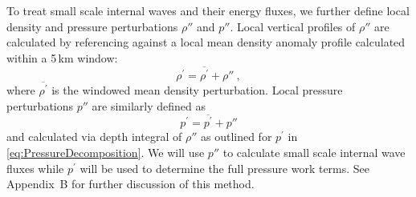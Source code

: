 \documentclass{ametsocV6.1}
\begin{document}
To treat small scale internal waves and their energy fluxes, we further define local density and pressure perturbations $\rho''$ and $p''$.
Local vertical profiles of $\rho''$ are calculated by referencing against a local mean density anomaly profile calculated within a 5\,km window:
\begin{equation}
\rho^\prime = \overline{\rho^\prime} + \rho''\ ,
\end{equation}
where $\overline{\rho^\prime}$ is the windowed mean density perturbation.
Local pressure perturbations $p''$ are similarly defined as
\begin{equation}
p^\prime = \overline{p^\prime} + p''
\label{eq:BaroclinicPressureDecomposition} 
\end{equation}
and calculated via depth integral of $\rho''$ as outlined for $p^\prime$ in \eqref{eq:PressureDecomposition}.
We will use $p''$ to calculate small scale internal wave fluxes while $p^\prime$ will be used to determine the full pressure work terms.
See Appendix~B for further discussion of this method.
\end{document}
